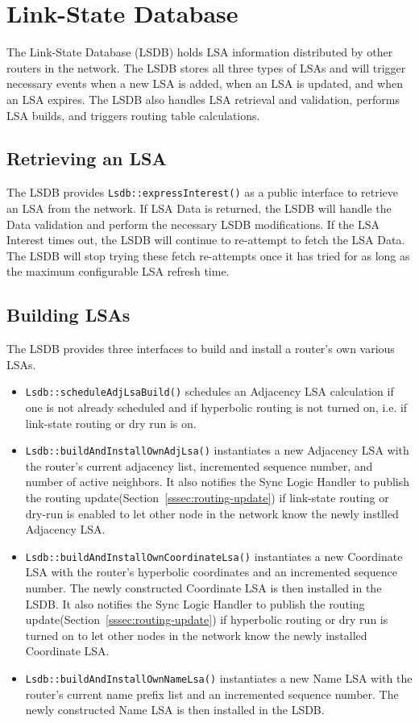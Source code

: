 \section{Link-State Database}
\label{sec:lsdb}

The Link-State Database (LSDB) holds LSA information distributed by other routers in the network.
The LSDB stores all three types of LSAs and will trigger necessary events when a new LSA is added, when an LSA is updated, and when an LSA expires.
The LSDB also handles LSA retrieval and validation, performs LSA builds, and triggers routing table calculations.

\subsection{Retrieving an LSA}

The LSDB provides \texttt{Lsdb::expressInterest()} as a public interface to retrieve an LSA from the network.
If LSA Data is returned, the LSDB will handle the Data validation and perform the necessary LSDB modifications.
If the LSA Interest times out, the LSDB will continue to re-attempt to fetch the LSA Data.
The LSDB will stop trying these fetch re-attempts once it has tried for as long as the maximum configurable LSA refresh time.

\subsection{Building LSAs}

The LSDB provides three interfaces to build and install a router's own various LSAs.
\begin{itemize}
\item \texttt{Lsdb::scheduleAdjLsaBuild()} schedules an Adjacency LSA calculation if one is not already scheduled and if hyperbolic routing is not turned on, i.e. if link-state routing or dry run is on.
\item \texttt{Lsdb::buildAndInstallOwnAdjLsa()} instantiates a new Adjacency LSA with the router's current adjacency list, incremented sequence number, and number of active neighbors. It also notifies the Sync Logic Handler to publish the routing update(Section~\ref{sssec:routing-update}) if link-state routing or dry-run is enabled to let other node in the network know the newly instlled Adjacency LSA.
\item \texttt{Lsdb::buildAndInstallOwnCoordinateLsa()} instantiates a new Coordinate LSA with the router's hyperbolic coordinates and an incremented sequence number. The newly constructed Coordinate LSA is then installed in the LSDB. It also notifies the Sync Logic Handler to publish the routing update(Section~\ref{sssec:routing-update}) if hyperbolic routing or dry run is turned on to let other nodes in the network know the newly installed Coordinate LSA.
\item \texttt{Lsdb::buildAndInstallOwnNameLsa()} instantiates a new Name LSA with the router's current name prefix list and an incremented sequence number. The newly constructed Name LSA is then installed in the LSDB.
\end{itemize}

